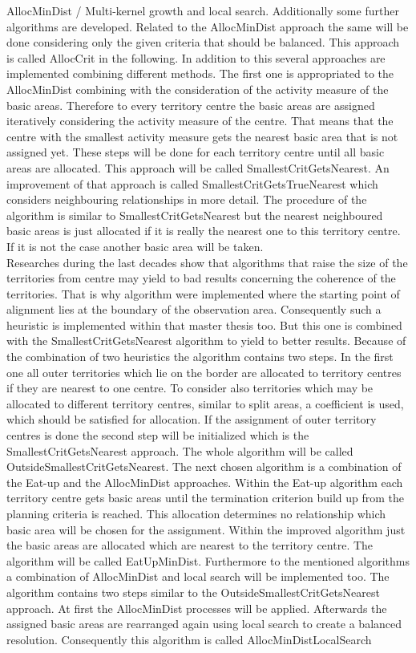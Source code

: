 AllocMinDist / Multi-kernel growth and local search. Additionally some further algorithms are developed. Related to the AllocMinDist approach the same will be done considering only the given criteria that should be balanced. This approach is called AllocCrit in the following. In addition to this several approaches are implemented combining different methods. The first one is appropriated to the AllocMinDist combining with the consideration of the activity measure of the basic areas. Therefore to every territory centre the basic areas are assigned iteratively considering the activity measure of the centre. That means that the centre with the smallest activity measure gets the nearest basic area that is not assigned yet. These steps will be done for each territory centre until all basic areas are allocated. This approach will be called SmallestCritGetsNearest. An improvement of that approach is called SmallestCritGetsTrueNearest which considers neighbouring relationships in more detail. The procedure of the algorithm is similar to SmallestCritGetsNearest but the nearest neighboured basic areas is just allocated if it is really the nearest one to this territory centre. If it is not the case another basic area will be taken. \\ Researches during the last decades show that algorithms that raise the size of the territories from centre may yield to bad results concerning the coherence of the territories. That is why algorithm were implemented where the starting point of alignment lies at the boundary of the observation area. Consequently such a heuristic is implemented within that master thesis too. But this one is combined with the SmallestCritGetsNearest algorithm to yield to better results. Because of the combination of two heuristics the algorithm contains two steps. In the first one all outer territories which lie on the border are allocated to territory centres if they are nearest to one centre. To consider also territories which may be allocated to different territory centres, similar to split areas, a coefficient is used, which should be satisfied for allocation. If the assignment of outer territory centres is done the second step will be initialized which is the SmallestCritGetsNearest approach. The whole algorithm will be called OutsideSmallestCritGetsNearest. The next chosen algorithm is a combination of the Eat-up and the AllocMinDist approaches. Within the Eat-up algorithm each territory centre gets basic areas until the termination criterion build up from the planning criteria is reached. This allocation determines no relationship which basic area will be chosen for the assignment. Within the improved algorithm just the basic areas are allocated which are nearest to the territory centre. The algorithm will be called EatUpMinDist. Furthermore to the mentioned algorithms a combination of AllocMinDist and local search will be implemented too. The algorithm contains two steps similar to the OutsideSmallestCritGetsNearest approach. At first the AllocMinDist processes will be applied. Afterwards the assigned basic areas are rearranged again using local search to create a balanced resolution. Consequently this algorithm is called AllocMinDistLocalSearch\\
